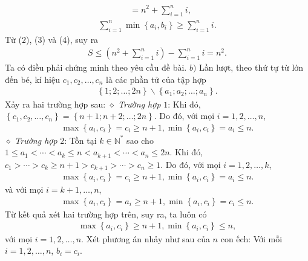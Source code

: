\begin{multicols}{2}
\begin{align*}
		&= {n^2} + \sum\limits_{i = 1}^n i,  \tag{$3$}
	\end{align*}
\begin{align*}
	\sum\limits_{i = 1}^n {\min \left\{ {{a_i},{b_i}} \right\}}  \ge \sum\limits_{i = 1}^n i. \tag{$4$}
\end{align*}
	Từ ($2$), ($3$) và ($4$), suy ra
	\begin{align*}
		S \le \left( {{n^2} + \sum\limits_{i = 1}^n i } \right) - \sum\limits_{i = 1}^n i  = {n^2}.
	\end{align*}
	Ta có điều phải chứng minh theo yêu cầu đề bài.
	\vskip 0.05cm
	$b)$ Lần lượt, theo thứ tự từ lớn đến bé, kí hiệu ${c_1},{c_2}, \ldots ,{c_n}$  là các phần tử của tập hợp
	\begin{align*}
		\left\{ {1;2; \ldots ;2n} \right\}\backslash \left\{ {{a_1};{a_2}; \ldots ;{a_n}} \right\}.
	\end{align*}
	Xảy ra hai trường hợp sau:
	\vskip 0.05cm
	$\diamond$ \textit{Trường hợp} $1$:
	\vskip 0.05cm  
	Khi đó, $\left\{ {{c_1},{c_2}, \ldots ,{c_n}} \right\} = \left\{ {n + 1;n + 2; \ldots ;2n} \right\}.$  Do đó, với mọi $i = 1, 2, \ldots, n$,
	\begin{align*}
		\max \!\left\{\! {{a_i},{c_i}} \!\right\} \!=\! {c_i} \!\ge\! n \!+\! 1, \min\! \left\{\! {{a_i},{c_i}} \!\right\} \!=\! {a_i} \!\le\! n.
	\end{align*}
	$\diamond$ \textit{Trường hợp} $2$: Tồn tại $k \in \mathbb{N^*}$  sao cho  $1 \le {a_1} <  \cdots  < {a_k} \le n < {a_{k + 1}} <  \cdots  < {a_n} \le 2n.$ 
	\vskip 0.05cm
	Khi đó, ${c_1} >  \cdots  > {c_k} \ge n + 1 > {c_{k + 1}} >  \cdots  > {c_n} \ge 1.$ 
	\vskip 0.05cm
	Do đó, với mọi $i = 1, 2, …, k$,
	\begin{align*}
		\max \!\left\{\! {{a_i},{c_i}} \!\right\} \!=\! {c_i} \!\ge\! n \!+\! 1, \min\! \left\{ \!{{a_i},{c_i}} \!\right\} \!=\! {a_i} \!\le\! n.
	\end{align*}
	và với mọi $i = k + 1, …, n$,
	\begin{align*}
		\max\! \left\{\! {{a_i},{c_i}} \!\right\} \!=\! {a_i} \!\ge\! n \!+\! 1, \min\! \left\{\! {{a_i},{c_i}} \!\right\} \!=\! {c_i} \!\le\! n.
	\end{align*}
	Từ kết quả xét hai trường hợp trên, suy ra, ta luôn có
	\begin{align*}
		\max \!\left\{\! {{a_i},{c_i}} \!\right\} \!\ge\! n \!+\! 1,\min\! \left\{\! {{a_i},{c_i}} \!\right\} \!\le\! n, \tag{$5$}
	\end{align*}
	với mọi $i = 1, 2, \ldots, n$.
	\vskip 0.05cm
	Xét phương án nhảy như sau của $n$ con ếch: Với mỗi $i = 1, 2, \ldots, n$, $b_i = c_i$.

\end{multicols}
